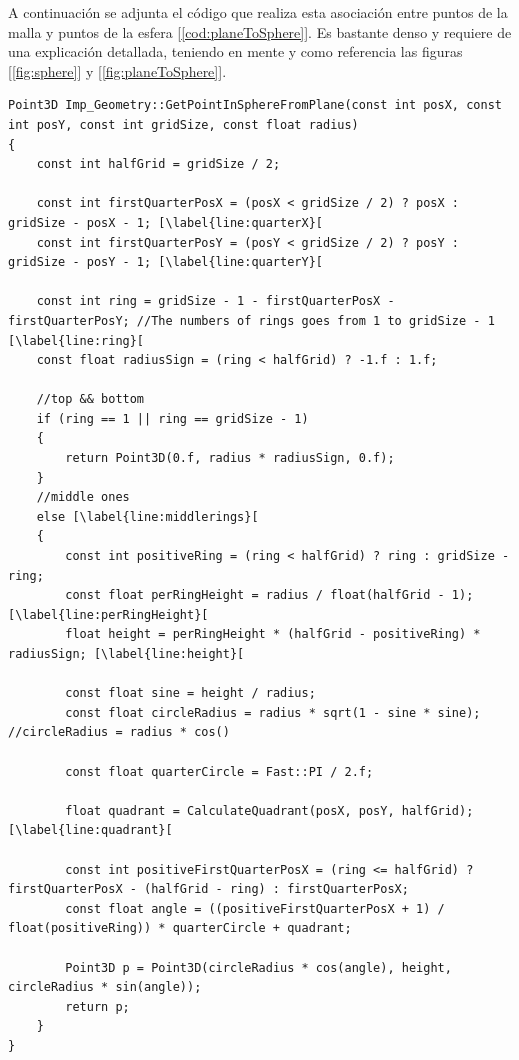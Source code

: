 A continuación se adjunta el código que realiza esta asociación entre puntos de la malla y puntos de la esfera [\ref{cod:planeToSphere}]. Es bastante denso y requiere de una explicación detallada, teniendo en mente y como referencia las figuras [\ref{fig:sphere}] y [\ref{fig:planeToSphere}].\\

\begin{lstlisting}[style=C-color, caption={Método que establece una relación entre los vértices de un plano y una esfera},label=cod:planeToSphere, escapechar=[]
Point3D Imp_Geometry::GetPointInSphereFromPlane(const int posX, const int posY, const int gridSize, const float radius)
{
    const int halfGrid = gridSize / 2;

    const int firstQuarterPosX = (posX < gridSize / 2) ? posX : gridSize - posX - 1; [\label{line:quarterX}[
    const int firstQuarterPosY = (posY < gridSize / 2) ? posY : gridSize - posY - 1; [\label{line:quarterY}[

    const int ring = gridSize - 1 - firstQuarterPosX - firstQuarterPosY; //The numbers of rings goes from 1 to gridSize - 1 [\label{line:ring}[
    const float radiusSign = (ring < halfGrid) ? -1.f : 1.f;

    //top && bottom
    if (ring == 1 || ring == gridSize - 1)
    {
        return Point3D(0.f, radius * radiusSign, 0.f);
    }
    //middle ones
    else [\label{line:middlerings}[
    {
        const int positiveRing = (ring < halfGrid) ? ring : gridSize - ring;
        const float perRingHeight = radius / float(halfGrid - 1);[\label{line:perRingHeight}[
        float height = perRingHeight * (halfGrid - positiveRing) * radiusSign; [\label{line:height}[

        const float sine = height / radius;
        const float circleRadius = radius * sqrt(1 - sine * sine); //circleRadius = radius * cos()

        const float quarterCircle = Fast::PI / 2.f;

        float quadrant = CalculateQuadrant(posX, posY, halfGrid); [\label{line:quadrant}[

        const int positiveFirstQuarterPosX = (ring <= halfGrid) ? firstQuarterPosX - (halfGrid - ring) : firstQuarterPosX;
        const float angle = ((positiveFirstQuarterPosX + 1) / float(positiveRing)) * quarterCircle + quadrant;

        Point3D p = Point3D(circleRadius * cos(angle), height, circleRadius * sin(angle));
        return p;
    }
}
\end{lstlisting}

